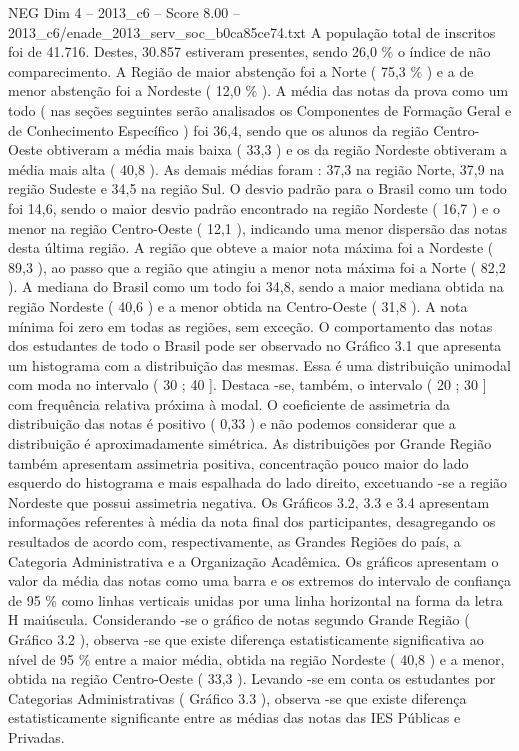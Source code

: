\begin{textsample}{NEG Dim 4 – 2013\_c6 – Score 8.00 – 2013\_c6/enade\_2013\_serv\_soc\_b0ca85ce74.txt}
A população total de inscritos foi de 41.716.
Destes, 30.857 estiveram presentes, sendo 26,0 \% o índice de não comparecimento.
A Região de maior abstenção foi a Norte ( 75,3 \% ) e a de menor abstenção foi a Nordeste ( 12,0 \% ).
A média das notas da prova como um todo ( nas seções seguintes serão analisados os Componentes de Formação Geral e de Conhecimento Específico ) foi 36,4, sendo que os alunos da região Centro-Oeste obtiveram a média mais baixa ( 33,3 ) e os da região Nordeste obtiveram a média mais alta ( 40,8 ).
As demais médias foram : 37,3 na região Norte, 37,9 na região Sudeste e 34,5 na região Sul.
O desvio padrão para o Brasil como um todo foi 14,6, sendo o maior desvio padrão encontrado na região Nordeste ( 16,7 ) e o menor na região Centro-Oeste ( 12,1 ), indicando uma menor dispersão das notas desta última região.
A região que obteve a maior nota máxima foi a Nordeste ( 89,3 ), ao passo que a região que atingiu a menor nota máxima foi a Norte ( 82,2 ).
A mediana do Brasil como um todo foi 34,8, sendo a maior mediana obtida na região Nordeste ( 40,6 ) e a menor obtida na Centro-Oeste ( 31,8 ).
A nota mínima foi zero em todas as regiões, sem exceção.
O comportamento das notas dos estudantes de todo o Brasil pode ser observado no Gráfico 3.1 que apresenta um histograma com a distribuição das mesmas.
Essa é uma distribuição unimodal com moda no intervalo ( 30 ; 40 ].
Destaca -se, também, o intervalo ( 20 ; 30 ] com frequência relativa próxima à modal.
O coeficiente de assimetria da distribuição das notas é positivo ( 0,33 ) e não podemos considerar que a distribuição é aproximadamente simétrica.
As distribuições por Grande Região também apresentam assimetria positiva, concentração pouco maior do lado esquerdo do histograma e mais espalhada do lado direito, excetuando -se a região Nordeste que possui assimetria negativa.
Os Gráficos 3.2, 3.3 e 3.4 apresentam informações referentes à média da nota final dos participantes, desagregando os resultados de acordo com, respectivamente, as Grandes Regiões do país, a Categoria Administrativa e a Organização Acadêmica.
Os gráficos apresentam o valor da média das notas como uma barra e os extremos do intervalo de confiança de 95 \% como linhas verticais unidas por uma linha horizontal na forma da letra H maiúscula.
Considerando -se o gráfico de notas segundo Grande Região ( Gráfico 3.2 ), observa -se que existe diferença estatisticamente significativa ao nível de 95 \% entre a maior média, obtida na região Nordeste ( 40,8 ) e a menor, obtida na região Centro-Oeste ( 33,3 ).
Levando -se em conta os estudantes por Categorias Administrativas ( Gráfico 3.3 ), observa -se que existe diferença estatisticamente significante entre as médias das notas das IES Públicas e Privadas.

\end{textsample}
